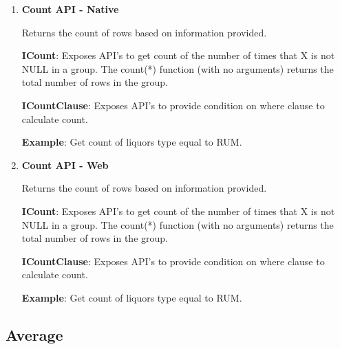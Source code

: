 		\begin{enumerate}

			\item \small \textbf{Count API - Native}	

				\par
				Returns the count of rows based on information provided.
					
		
				\textbf{ICount}:  Exposes API's to get count of the number of times that X is not NULL in a group.
						 The count(*) function (with no arguments) returns the total number of rows in the group.

					

			
				\textbf{ICountClause}: Exposes API's to provide condition on where clause to calculate count.
					

				\textbf{Example}: Get count of liquors type equal to RUM.
					


			\item \small \textbf{Count API - Web}		
				\par
				Returns the count of rows based on information provided.
					
		
				\textbf{ICount}:  Exposes API's to get count of the number of times that X is not NULL in a group.
						 The count(*) function (with no arguments) returns the total number of rows in the group.

					

			
				\textbf{ICountClause}: Exposes API's to provide condition on where clause to calculate count.
					

				\textbf{Example}: Get count of liquors type equal to RUM.
					

		\end{enumerate}



	\subsection{Average} 

